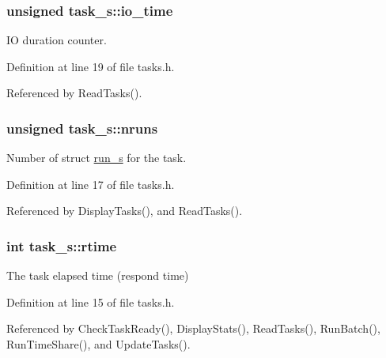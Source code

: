 \hypertarget{structtask__s_a35bfd62bed257847312e3da43efd6d9c}{
\subsubsection[{io\-\_\-time}]{\setlength{\rightskip}{0pt plus 5cm}unsigned task\-\_\-s\-::io\-\_\-time}}\label{structtask__s_a35bfd62bed257847312e3da43efd6d9c}


I\-O duration counter. 



Definition at line 19 of file tasks.\-h.



Referenced by Read\-Tasks().

\hypertarget{structtask__s_a8906d14cfe47645b29a2333b4b92c550}{
\subsubsection[{nruns}]{\setlength{\rightskip}{0pt plus 5cm}unsigned task\-\_\-s\-::nruns}}\label{structtask__s_a8906d14cfe47645b29a2333b4b92c550}


Number of struct \hyperlink{structrun__s}{run\-\_\-s} for the task. 



Definition at line 17 of file tasks.\-h.



Referenced by Display\-Tasks(), and Read\-Tasks().

\hypertarget{structtask__s_a159561283a0943e9a7f587ff1f413d99}{
\subsubsection[{rtime}]{\setlength{\rightskip}{0pt plus 5cm}int task\-\_\-s\-::rtime}}\label{structtask__s_a159561283a0943e9a7f587ff1f413d99}


The task elapsed time (respond time) 



Definition at line 15 of file tasks.\-h.



Referenced by Check\-Task\-Ready(), Display\-Stats(), Read\-Tasks(), Run\-Batch(), Run\-Time\-Share(), and Update\-Tasks().

